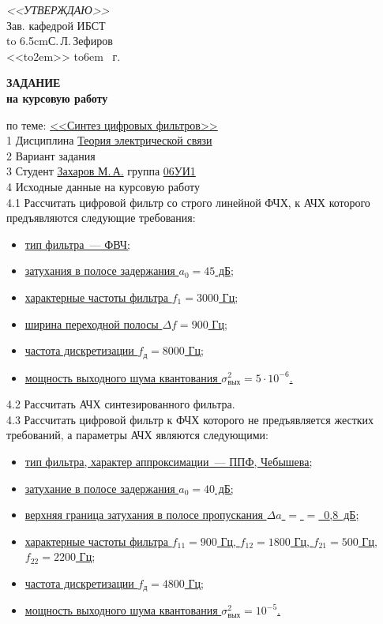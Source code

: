 \hfill\parbox{6.5cm}{
	\textit{<<УТВЕРЖДАЮ>>}\\
	Зав. кафедрой ИБСТ\\
	\hbox to 6.5cm{\hrulefill С.\,Л.\,Зефиров}\\
	\def\hrf#1{\hbox to#1{\hrulefill}}
	<<\hrf{2em}>> \hrf{6em} \the\year~г.}	
	
      \begin{center}\textbf{\normalfont\bfseries\large ЗАДАНИЕ}\\\textbf{на
        курсовую работу}\end{center}

\noindent по теме: \uline{<<Синтез цифровых фильтров>>\hfill}\\
1 Дисциплина \uline{\qquad Теория электрической связи\hfill}\\
2 Вариант задания \uline{\hfill}\\
3 Студент \uline{\qquad Захаров М.\,А.\qquad } группа \uline{\qquad 06УИ1\hfill}\\
4 Исходные данные на курсовую работу\\
4.1 Рассчитать цифровой фильтр со строго линейной ФЧХ, к АЧХ которого
предъявляются следующие требования:
\begin{itemize}
\item \uline{тип фильтра~--- ФВЧ;\hfill\quad}
\item \uline{затухания в полосе задержания $a_0 = 45$ дБ;\hfill\quad}
\item \uline{характерные частоты фильтра $f_1 = 3000$ Гц;\hfill\quad}
\item \uline{ширина переходной полосы $\Delta f = 900$ Гц;\hfill\quad}
\item \uline{частота дискретизации $f_{\text{д}} = 8000$
    Гц;\hfill\quad}
\item \uline{мощность выходного шума квантования
    $\sigma^2_{\text{вых}} = 5 \cdot 10^{-6}$.\hfill\quad}
\end{itemize}
4.2 Рассчитать АЧХ синтезированного фильтра.\\
4.3 Рассчитать цифровой фильтр к ФЧХ которого не предъявляется жестких
требований, а параметры АЧХ являются следующими:
\begin{itemize}
\item \uline{тип фильтра, характер аппроксимации~--- ППФ,
    Чебышева;\hfill \quad}
\item \uline{затухание в полосе задержания $a_0 = 40$ дБ;\hfill \quad}
\item \uline{верхняя граница затухания в полосе пропускания $\Delta a$ 
    $=$ $=$~0{,}8~дБ;\hfill \quad}
\item \uline{характерные частоты фильтра $f_{11} = 900$ Гц, $f_{12} =
    1800$ Гц, $f_{21} = 500$ Гц, $f_{22} = 2200$ Гц;\hfill \quad}
\item \uline{частота дискретизации $f_{\text{д}} = 4800$ Гц;\hfill \quad}
\item \uline{мощность выходного шума квантования
    $\sigma^2_{\text{вых}} = 10^{-5}$.\hfill\quad}
\end{itemize}
